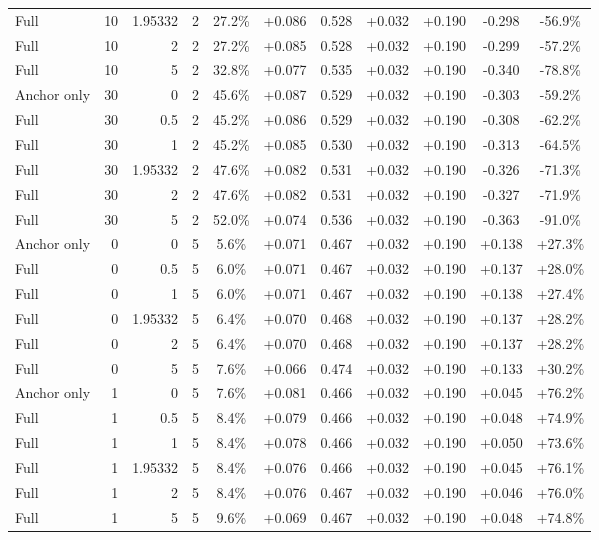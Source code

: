 \begin{table}[htbp]
\begin{tabular}{lrrrccccccc}
Full & 10 & 1.95332 & 2 & 27.2\% & +0.086 & 0.528 & +0.032 & +0.190 & -0.298 & -56.9\% \\
Full & 10 & 2 & 2 & 27.2\% & +0.085 & 0.528 & +0.032 & +0.190 & -0.299 & -57.2\% \\
Full & 10 & 5 & 2 & 32.8\% & +0.077 & 0.535 & +0.032 & +0.190 & -0.340 & -78.8\% \\
Anchor only & 30 & 0 & 2 & 45.6\% & +0.087 & 0.529 & +0.032 & +0.190 & -0.303 & -59.2\% \\
Full & 30 & 0.5 & 2 & 45.2\% & +0.086 & 0.529 & +0.032 & +0.190 & -0.308 & -62.2\% \\
Full & 30 & 1 & 2 & 45.2\% & +0.085 & 0.530 & +0.032 & +0.190 & -0.313 & -64.5\% \\
Full & 30 & 1.95332 & 2 & 47.6\% & +0.082 & 0.531 & +0.032 & +0.190 & -0.326 & -71.3\% \\
Full & 30 & 2 & 2 & 47.6\% & +0.082 & 0.531 & +0.032 & +0.190 & -0.327 & -71.9\% \\
Full & 30 & 5 & 2 & 52.0\% & +0.074 & 0.536 & +0.032 & +0.190 & -0.363 & -91.0\% \\
Anchor only & 0 & 0 & 5 & 5.6\% & +0.071 & 0.467 & +0.032 & +0.190 & +0.138 & +27.3\% \\
Full & 0 & 0.5 & 5 & 6.0\% & +0.071 & 0.467 & +0.032 & +0.190 & +0.137 & +28.0\% \\
Full & 0 & 1 & 5 & 6.0\% & +0.071 & 0.467 & +0.032 & +0.190 & +0.138 & +27.4\% \\
Full & 0 & 1.95332 & 5 & 6.4\% & +0.070 & 0.468 & +0.032 & +0.190 & +0.137 & +28.2\% \\
Full & 0 & 2 & 5 & 6.4\% & +0.070 & 0.468 & +0.032 & +0.190 & +0.137 & +28.2\% \\
Full & 0 & 5 & 5 & 7.6\% & +0.066 & 0.474 & +0.032 & +0.190 & +0.133 & +30.2\% \\
Anchor only & 1 & 0 & 5 & 7.6\% & +0.081 & 0.466 & +0.032 & +0.190 & +0.045 & +76.2\% \\
Full & 1 & 0.5 & 5 & 8.4\% & +0.079 & 0.466 & +0.032 & +0.190 & +0.048 & +74.9\% \\
Full & 1 & 1 & 5 & 8.4\% & +0.078 & 0.466 & +0.032 & +0.190 & +0.050 & +73.6\% \\
Full & 1 & 1.95332 & 5 & 8.4\% & +0.076 & 0.466 & +0.032 & +0.190 & +0.045 & +76.1\% \\
Full & 1 & 2 & 5 & 8.4\% & +0.076 & 0.467 & +0.032 & +0.190 & +0.046 & +76.0\% \\
Full & 1 & 5 & 5 & 9.6\% & +0.069 & 0.467 & +0.032 & +0.190 & +0.048 & +74.8\% \\

\end{tabular}
\end{table}
